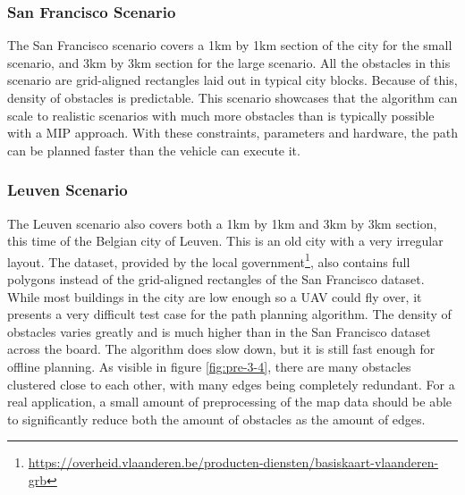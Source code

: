 \subsubsection{San Francisco Scenario}
The San Francisco scenario covers a 1km by 1km section of the city for the small scenario, and 3km by 3km section for the large scenario. All the obstacles in this scenario are grid-aligned rectangles laid out in typical city blocks. Because of this, density of obstacles is predictable. This scenario showcases that the algorithm can scale to realistic scenarios with much more obstacles than is typically possible with a MIP approach. With these constraints, parameters and hardware, the path can be planned faster than the vehicle can execute it.

\subsubsection{Leuven Scenario}
The Leuven scenario also covers both a 1km by 1km and 3km by 3km section, this time of the Belgian city of Leuven. This is an old city with a very irregular layout. The dataset, provided by the local government\footnote{\url{https://overheid.vlaanderen.be/producten-diensten/basiskaart-vlaanderen-grb}}, also contains full polygons instead of the grid-aligned rectangles of the San Francisco dataset. While most buildings in the city are low enough so a UAV could fly over, it presents a very difficult test case for the path planning algorithm. The density of obstacles varies greatly and is much higher than in the San Francisco dataset across the board. The algorithm does slow down, but it is still fast enough for offline planning. As visible in figure \ref{fig:pre-3-4}, there are many obstacles clustered close to each other, with many edges being completely redundant. For a real application, a small amount of preprocessing of the map data should be able to significantly reduce both the amount of obstacles as the amount of edges. 

